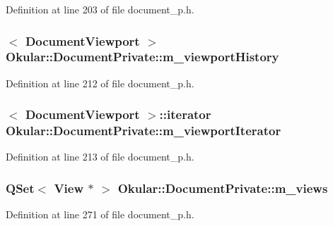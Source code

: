 Definition at line 203 of file document\+\_\+p.\+h.

\hypertarget{classOkular_1_1DocumentPrivate_a47ead6a6650c01fb91ac512e55320f87}{
\subsubsection[{m\+\_\+viewport\+History}]{$<$ {\bf Document\+Viewport} $>$ Okular\+::\+Document\+Private\+::m\+\_\+viewport\+History}}\label{classOkular_1_1DocumentPrivate_a47ead6a6650c01fb91ac512e55320f87}


Definition at line 212 of file document\+\_\+p.\+h.

\hypertarget{classOkular_1_1DocumentPrivate_a81a62e8d31d0e7873cd5f5c1590fa2fc}{
\subsubsection[{m\+\_\+viewport\+Iterator}]{$<$ {\bf Document\+Viewport} $>$\+::iterator Okular\+::\+Document\+Private\+::m\+\_\+viewport\+Iterator}}\label{classOkular_1_1DocumentPrivate_a81a62e8d31d0e7873cd5f5c1590fa2fc}


Definition at line 213 of file document\+\_\+p.\+h.

\hypertarget{classOkular_1_1DocumentPrivate_aae4139cb4cb2f63fd7c7c88f26199976}{
\subsubsection[{m\+\_\+views}]{\setlength{\rightskip}{0pt plus 5cm}Q\+Set$<$ {\bf View} $\ast$ $>$ Okular\+::\+Document\+Private\+::m\+\_\+views}}\label{classOkular_1_1DocumentPrivate_aae4139cb4cb2f63fd7c7c88f26199976}


Definition at line 271 of file document\+\_\+p.\+h.

